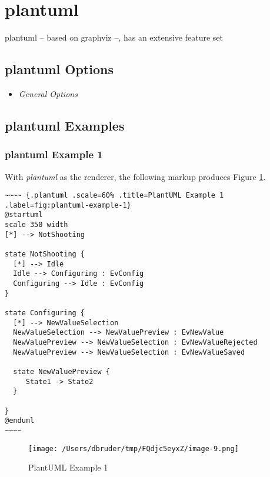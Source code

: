 \documentclass[]{article}
\begin{document}
\newpage

\section{plantuml}\label{plantuml}

plantuml -- based on graphviz --, has an extensive feature set

\subsection{plantuml Options}\label{plantuml-options}

\begin{itemize}
\itemsep1pt\parskip0pt
\item
  \emph{General Options}
\end{itemize}

\subsection{plantuml Examples}\label{plantuml-examples}

\subsubsection{plantuml Example 1}\label{plantuml-example-1}

With \emph{plantuml} as the renderer, the following markup produces
Figure \ref{fig:plantuml-example-1}.

\scriptsize

\begin{verbatim}
~~~~ {.plantuml .scale=60% .title=PlantUML Example 1 .label=fig:plantuml-example-1}
@startuml
scale 350 width
[*] --> NotShooting

state NotShooting {
  [*] --> Idle
  Idle --> Configuring : EvConfig
  Configuring --> Idle : EvConfig
}

state Configuring {
  [*] --> NewValueSelection
  NewValueSelection --> NewValuePreview : EvNewValue
  NewValuePreview --> NewValueSelection : EvNewValueRejected
  NewValuePreview --> NewValueSelection : EvNewValueSaved

  state NewValuePreview {
     State1 -> State2
  }

}
@enduml
~~~~
\end{verbatim}

\normalsize

\begin{figure}[htbp]
\centering
\texttt{[image: /Users/dbruder/tmp/FQdjc5eyxZ/image-9.png]}
\caption{PlantUML Example 1\label{fig:plantuml-example-1}}
\end{figure}
\end{document}
